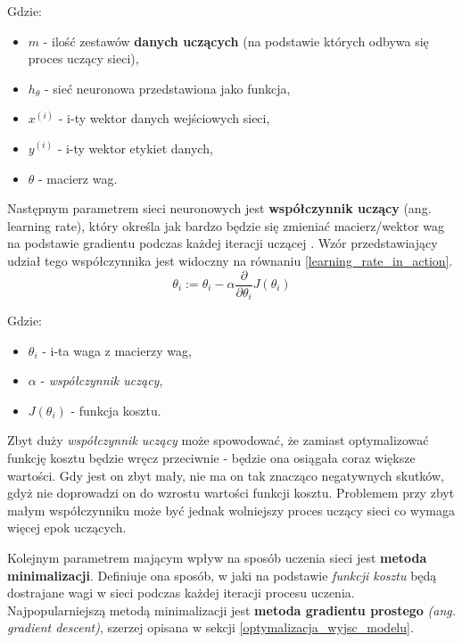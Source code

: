 \documentclass[12pt]{aghdpl}
\begin{document}
			Gdzie:
			
			\begin{itemize}
			\item $m$ - ilość zestawów \textbf{danych uczących} (na podstawie których odbywa się proces uczący sieci),
			\item $h_\theta$ - sieć neuronowa przedstawiona jako funkcja,
			\item $x^{(i)}$ - i-ty wektor danych wejściowych sieci,
			\item $y^{(i)}$ - i-ty wektor etykiet danych,
			\item $\theta$ - macierz wag.
			\end{itemize}
		
			
			Następnym parametrem sieci neuronowych jest \textbf{współczynnik uczący} (ang. learning rate), który określa jak bardzo będzie się zmieniać macierz/wektor wag na podstawie gradientu podczas każdej iteracji uczącej \cite{learning_rate}. Wzór przedstawiający udział tego współczynnika jest widoczny na równaniu \ref{learning_rate_in_action}.				
			\begin{equation} \label{learning_rate_in_action}
			\theta_i := \theta_i - \alpha \frac{\partial}{\partial\theta_i} J(\theta_i)
			\end{equation}
			
			Gdzie:
			
			\begin{itemize}
			\item $\theta_i$ - i-ta waga z macierzy wag,
			\item $\alpha$ - \textit{współczynnik uczący},
			\item $J(\theta_i)$ - funkcja kosztu.
			\end{itemize}
			
			 Zbyt duży \textit{współczynnik uczący} może spowodować, że zamiast optymalizować funkcję kosztu będzie wręcz przeciwnie - będzie ona osiągała coraz większe wartości. Gdy jest on zbyt mały, nie ma on tak znacząco negatywnych skutków, gdyż nie doprowadzi on do wzrostu wartości funkcji kosztu. Problemem przy zbyt małym współczynniku może być jednak wolniejszy proces uczący sieci co wymaga więcej epok uczących.
			 
			 Kolejnym parametrem mającym wpływ na sposób uczenia sieci jest \textbf{metoda minimalizacji}. Definiuje ona sposób, w jaki na podstawie \textit{funkcji kosztu} będą dostrajane wagi w sieci podczas każdej iteracji procesu uczenia. Najpopularniejszą metodą minimalizacji jest \textbf{metoda gradientu prostego} \textit{(ang. gradient descent)}, szerzej opisana w sekcji \ref{optymalizacja_wyjsc_modelu}.
			 
\end{document}
